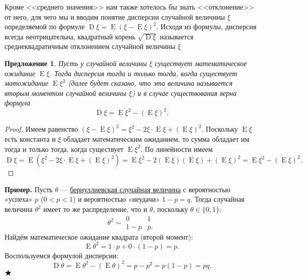 \documentclass[12pt]{article}
\newtheorem{proposition}[theorem]{Предложение}
\numberwithin{theorem}{section}
\theoremstyle{definition}
\newenvironment{example}{\indent \textbf{Пример.}}{$ \hfill \bigstar $}
\newcommand{\defin}[2]{\hypertarget{#2}{{\color{red} #1}}}
\newcommand{\expect}{\operatorname{E}}
\newcommand{\disp}{\operatorname{D}}
\begin{document}
	Кроме <<среднего значения>> нам также хотелось бы знать <<отклонение>> от него,
	для чего мы и вводим понятие \defin{дисперсии случайной величины $ \xi $},
	определяемой по формуле $ \disp\xi = \expect(\xi - \expect\xi)^2 $.
	Исходя из формулы, дисперсия всегда неотрицательна,
	квадратный корень $ \sqrt{\disp\xi} $ называется
	\defin{среднеквадратичным отклонением случайной величины $ \xi $}.
	
	\begin{proposition}
		Пусть у случайной величины $ \xi $ существует математическое ожидание $ \expect\xi $.
		Тогда дисперсия тогда и только тогда, когда существует матожидание 
		$ \expect\xi^2 $ (далее будет сказано, что эта величина называется вторым моментом случайной величины $ \xi $)
		и в случае существования верна формула
		$$ \disp\xi = \expect\xi^2 - (\expect\xi)^2. $$
	\end{proposition}
	
	\begin{proof}
		Имеем равенство $ (\xi - \expect\xi)^2 = \xi^2 - 2\xi \cdot \expect \xi + (\expect\xi)^2 $.
		Поскольку $ \expect\xi $ есть константа и $ \xi $ обладает математическим ожиданием,
		то сумма обладает им тогда и только тогда, когда существует $ \expect\xi^2 $.
		По линейности имеем
		$$ \disp\xi = \expect(\xi^2 - 2\xi \cdot \expect \xi + (\expect\xi)^2)
		= \expect\xi^2 - 2(\expect\xi)(\expect\xi) + (\expect\xi)^2 = \expect\xi^2 - (\expect\xi)^2. $$
	\end{proof}
	
	\begin{example}
		Пусть $\theta$ — \hyperlink{Bernoulli-distribution}{бернуллиевская случайная величина} с вероятностью «успеха» $p$ ($0 < p < 1$) и вероятностью «неудачи» $1 - p = q$.  
		Тогда случайная величина $\theta^2$ имеет то же распределение, что и $\theta$, поскольку $\theta \in \{0,1\}$:
		\[
		\theta^2 \sim
		\begin{array}{cc}
			0 & 1 \\
			1 - p & p.
		\end{array}
		\]
		Найдём математическое ожидание квадрата (второй момент):
		\[
		\expect\theta^2 = 1 \cdot p + 0 \cdot (1 - p) = p.
		\]
		Воспользуемся формулой дисперсии:
		\[
		\disp\theta = \expect\theta^2 - (\expect\theta)^2 = p - p^2 = p(1 - p) = pq.
		\]
	\end{example}
	
\end{document}
